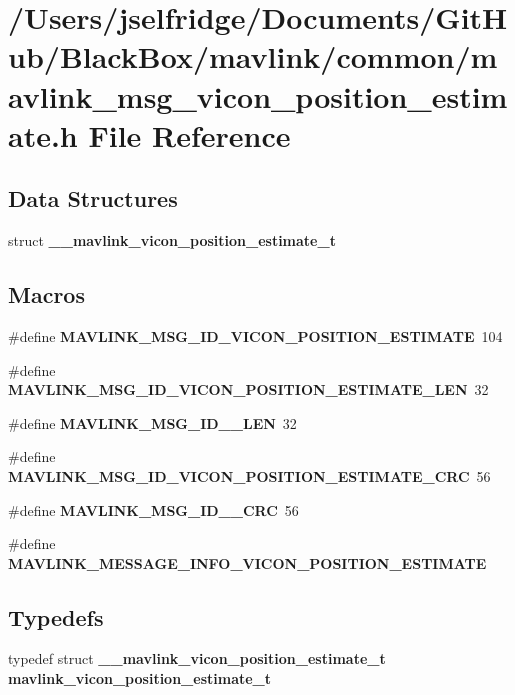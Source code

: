 \section{/\+Users/jselfridge/\+Documents/\+Git\+Hub/\+Black\+Box/mavlink/common/mavlink\+\_\+msg\+\_\+vicon\+\_\+position\+\_\+estimate.h File Reference}
\label{mavlink__msg__vicon__position__estimate_8h}
\subsection*{Data Structures}
\begin{DoxyCompactItemize}
\item 
struct \textbf{ \+\_\+\+\_\+mavlink\+\_\+vicon\+\_\+position\+\_\+estimate\+\_\+t}
\end{DoxyCompactItemize}
\subsection*{Macros}
\begin{DoxyCompactItemize}
\item 
\#define \textbf{ M\+A\+V\+L\+I\+N\+K\+\_\+\+M\+S\+G\+\_\+\+I\+D\+\_\+\+V\+I\+C\+O\+N\+\_\+\+P\+O\+S\+I\+T\+I\+O\+N\+\_\+\+E\+S\+T\+I\+M\+A\+TE}~104
\item 
\#define \textbf{ M\+A\+V\+L\+I\+N\+K\+\_\+\+M\+S\+G\+\_\+\+I\+D\+\_\+\+V\+I\+C\+O\+N\+\_\+\+P\+O\+S\+I\+T\+I\+O\+N\+\_\+\+E\+S\+T\+I\+M\+A\+T\+E\+\_\+\+L\+EN}~32
\item 
\#define \textbf{ M\+A\+V\+L\+I\+N\+K\+\_\+\+M\+S\+G\+\_\+\+I\+D\+\_\+\_\+\+L\+EN}~32
\item 
\#define \textbf{ M\+A\+V\+L\+I\+N\+K\+\_\+\+M\+S\+G\+\_\+\+I\+D\+\_\+\+V\+I\+C\+O\+N\+\_\+\+P\+O\+S\+I\+T\+I\+O\+N\+\_\+\+E\+S\+T\+I\+M\+A\+T\+E\+\_\+\+C\+RC}~56
\item 
\#define \textbf{ M\+A\+V\+L\+I\+N\+K\+\_\+\+M\+S\+G\+\_\+\+I\+D\+\_\+\_\+\+C\+RC}~56
\item 
\#define \textbf{ M\+A\+V\+L\+I\+N\+K\+\_\+\+M\+E\+S\+S\+A\+G\+E\+\_\+\+I\+N\+F\+O\+\_\+\+V\+I\+C\+O\+N\+\_\+\+P\+O\+S\+I\+T\+I\+O\+N\+\_\+\+E\+S\+T\+I\+M\+A\+TE}
\end{DoxyCompactItemize}
\subsection*{Typedefs}
\begin{DoxyCompactItemize}
\item 
typedef struct \textbf{ \+\_\+\+\_\+mavlink\+\_\+vicon\+\_\+position\+\_\+estimate\+\_\+t} \textbf{ mavlink\+\_\+vicon\+\_\+position\+\_\+estimate\+\_\+t}
\end{DoxyCompactItemize}


